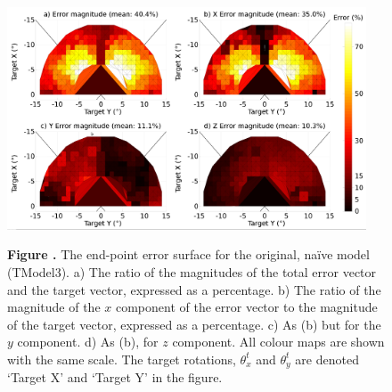 \documentclass{frontiersSCNS}
\begin{document}
\begin{figure}[htb!]
\begin{center}
\includegraphics[width=0.95\textwidth]{./figures/errorsurface_TModel3.png}
\end{center}
\textbf{\label{errorsurfaceTM3} Figure .}
{ The end-point error surface for the original, na\"ive model
(TModel3). a) The ratio of the magnitudes of the total error vector
and the target vector, expressed as a percentage. b) The ratio of the
magnitude of the $x$ component of the error vector to the magnitude of
the target vector, expressed as a percentage. c) As (b) but for the
$y$ component. d) As (b), for $z$ component. All colour maps are shown
with the same scale. The target rotations, $\theta_{x}^t$ and
$\theta_{y}^t$ are denoted `Target X' and `Target Y' in the figure.}
\end{figure}
\end{document}
